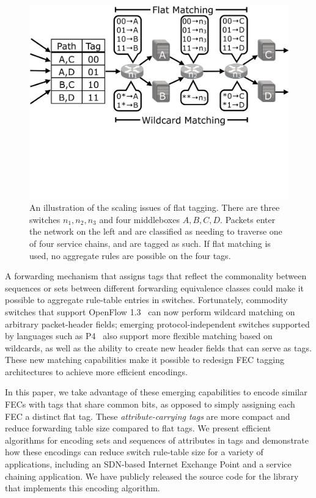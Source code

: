 \begin{figure}[t!] 
\begin{minipage}{1\linewidth}
\includegraphics[trim={0 10cm 0 0}, clip, width=\linewidth]{figures/mbox_path_example}
\end{minipage} 
\caption{An illustration of the scaling issues of flat tagging. There are three switches $n_1, n_2, n_3$ and four middleboxes $A,B,C,D$. Packets enter the network on the left and are classified as needing to traverse one of four service chains, and are tagged as such. If flat matching is used, no aggregate rules are possible on the four tags.  }
\label{fig:mbox_path}
\end{figure}

A forwarding mechanism that assigns tags that reflect the commonality
between sequences or sets between different forwarding equivalence
classes could make it possible to aggregate rule-table entries in
switches.  Fortunately, commodity switches that support OpenFlow
1.3~\cite{of13} can now perform wildcard matching on arbitrary
packet-header fields; emerging protocol-independent switches supported
by languages such as P4~\cite{P4} also support more flexible matching
based on wildcards, as well as the ability to create new header fields
that can serve as tags. These new matching capabilities make it
possible to redesign FEC tagging architectures to achieve more
efficient encodings.

In this paper, we take advantage of these emerging capabilities to
encode similar FECs with tags that share common bits, as opposed to
simply assigning each FEC a distinct flat tag.  These
\emph{attribute-carrying tags} are more compact and reduce forwarding
table size compared to flat tags. We present efficient algorithms for
encoding sets and sequences of attributes in tags and demonstrate how
these encodings can reduce switch rule-table size for a variety of
applications, including an SDN-based Internet Exchange Point and a
service chaining application. We have publicly released the source
code for the library that implements this encoding algorithm.

